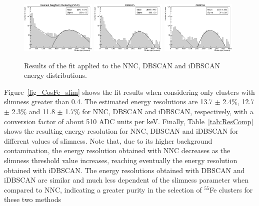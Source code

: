 \documentclass[a4paper,11pt]{article}
\begin{document}
\begin{figure}[ht]
\centering
\includegraphics[width=0.32\textwidth]{log_Resolution_NNC_0.pdf}
\includegraphics[width=0.32\textwidth]{log_Resolution_DBN_0.pdf}
\includegraphics[width=0.32\textwidth]{log_Resolution_IDB_0.pdf}
\caption{Results of the fit applied to the NNC, DBSCAN and iDBSCAN energy distributions.}
\label{fig_CosFe}
\end{figure}


%



Figure~\ref{fig_CosFe_slim} shows the fit results when considering only clusters with slimness greater than 0.4.
The estimated energy resolutions are 13.7 $\pm$ 2.4\%, 12.7 $\pm$ 2.3\% and 11.8 $\pm$ 1.7\% for NNC, DBSCAN and iDBSCAN, respectively, with a conversion factor of about 510 ADC units per keV.
Finally, Table~\ref{tab:ResComp} shows the resulting energy resolution for NNC, DBSCAN and iDBSCAN for different values of slimness.
Note that, due to its higher background contamination, the energy resolution obtained with NNC decreases as the slimness threshold value increases, reaching eventually the energy resolution obtained with iDBSCAN.
The energy resolutions obtained with DBSCAN and iDBSCAN are similar and much less dependent of the slimness parameter when compared to NNC, indicating a greater purity in the selection of $^{55}$Fe clusters for these two methods
\end{document}
